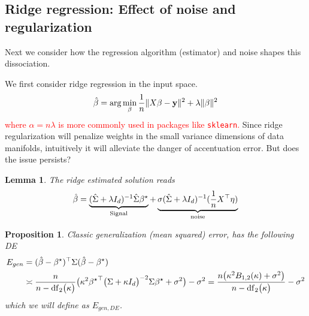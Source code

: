 \documentclass{article}
\newcommand{\red}[1]{\textcolor{red}{#1}}
\providecommand{\propositionname}{Proposition}
\providecommand{\lemmaname}{Lemma}
\theoremstyle{plain}
\newtheorem{prop}[thm]{\propositionname}
\newtheorem{lem}[thm]{\lemmaname}
\theoremstyle{definition}
\begin{document}

\subsection{Ridge regression: Effect of noise and regularization}
\label{sec:pixel-ridge}
Next we consider how the regression algorithm (estimator) and noise shapes this dissociation.

We first consider ridge regression in the input space.
\begin{equation}
    \hat{\beta}=\arg\min_\beta \frac1n\|X\beta-\mathbf y\|^2+\lambda\|\beta\|^2
\end{equation}
\red{where $\alpha=n\lambda$ is more commonly used in packages like \texttt{sklearn}. }
Since ridge regularization will penalize weights in the small variance dimensions of data manifolds, intuitively it will alleviate the danger of accentuation error.
But does the issue persists?
\begin{lem}
The ridge estimated solution reads
\begin{equation}
\hat{\beta}=\underbrace{(\hat{\Sigma}+\lambda I_{d})^{-1}\hat{\Sigma}{\beta^{\star}}}_{\text{Signal}}+\underbrace{\sigma(\hat{\Sigma}+\lambda I_{d})^{-1}(\frac{1}{n}X^{\top}\eta)}_{\text{noise}}
\end{equation}
\end{lem}
\begin{prop}\label{prop:pix_ridge_gen_err}
Classic generalization (mean squared) error, has the following DE
\begin{align*}
E_{gen} & =(\hat{\beta}-{\beta^{\star}})^{\top}\Sigma(\hat{\beta}-{\beta^{\star}})\\
 &\asymp \frac{n}{n-\mathrm{df}_{2}\bigl(\kappa\bigr)}\big(\kappa^{2}{{\beta^{\star}}}^{\top}\bigl(\Sigma+\kappa I_{d}\bigr)^{-2}\Sigma{\beta^{\star}}+\sigma^{2}\big)-\sigma^{2} =\frac{n\big(\kappa^{2}B_{1,2}(\kappa)+\sigma^{2}\big)}{n-\mathrm{df}_{2}\bigl(\kappa\bigr)}-\sigma^{2}
\end{align*}
which we will define as $E_{gen,DE}$.
\end{prop}
\end{document}
